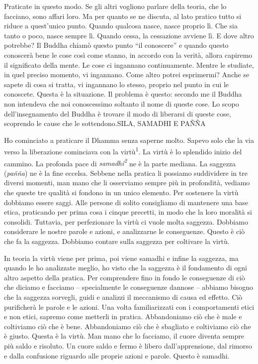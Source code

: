 Praticate in questo modo. Se gli altri vogliono parlare della teoria,
che lo facciano, sono affari loro. Ma per quanto se ne discuta, al lato
pratico tutto si riduce a quest'unico punto. Quando qualcosa nasce,
nasce proprio lì. Che sia tanto o poco, nasce sempre lì. Quando cessa,
la cessazione avviene lì. E dove altro potrebbe? Il Buddha chiamò questo
punto ``il conoscere'' e quando questo conoscerà bene le cose così come
stanno, in accordo con la verità, allora capiremo il significato della
mente. Le cose ci ingannano continuamente. Mentre le studiate, in quel
preciso momento, vi ingannano. Come altro potrei esprimermi? Anche se
sapete di cosa si tratta, vi ingannano lo stesso, proprio nel punto in
cui le conoscete. Questa è la situazione. Il problema è questo: secondo
me il Buddha non intendeva che noi conoscessimo soltanto il nome di
queste cose. Lo scopo dell'insegnamento del Buddha è trovare il modo di
liberarsi di queste cose, scoprendo le cause che le sottendono.SILA,
SAMADHI E PAÑÑA

Ho cominciato a praticare il Dhamma senza saperne molto. Sapevo solo che
la via verso la liberazione cominciava con la virtù\textsuperscript{1}.
La virtù è lo splendido inizio del cammino. La profonda pace di
\emph{samadhi\textsuperscript{2}} ne è la parte mediana. La saggezza
(\emph{pañña}) ne è la fine eccelsa. Sebbene nella pratica li possiamo
suddividere in tre diversi momenti, man mano che li osserviamo sempre
più in profondità, vediamo che queste tre qualità si fondono in un unico
elemento. Per sostenere la virtù dobbiamo essere saggi. Alle persone di
solito consigliamo di mantenere una base etica, praticando per prima
cosa i cinque precetti, in modo che la loro moralità si consolidi.
Tuttavia, per perfezionare la virtù ci vuole molta saggezza. Dobbiamo
considerare le nostre parole e azioni, e analizzarne le conseguenze.
Questo è ciò che fa la saggezza. Dobbiamo contare sulla saggezza per
coltivare la virtù.

In teoria la virtù viene per prima, poi viene samadhi e infine la
saggezza, ma quando le ho analizzate meglio, ho visto che la saggezza è
il fondamento di ogni altro aspetto della pratica. Per comprendere fino
in fondo le conseguenze di ciò che diciamo e facciamo -- specialmente le
conseguenze dannose -- abbiamo bisogno che la saggezza sorvegli, guidi e
analizzi il meccanismo di causa ed effetto. Ciò purificherà le parole e
le azioni. Una volta familiarizzati con i comportamenti etici e non
etici, sapremo come metterli in pratica. Abbandoniamo ciò che è male e
coltiviamo ciò che è bene. Abbandoniamo ciò che è sbagliato e coltiviamo
ciò che è giusto. Questa è la virtù. Man mano che lo facciamo, il cuore
diventa sempre più saldo e risoluto. Un cuore saldo e fermo è libero
dall'apprensione, dal rimorso e dalla confusione riguardo alle proprie
azioni e parole. Questo è samadhi.

